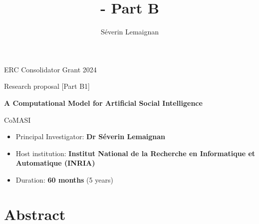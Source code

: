 \documentclass[11pt,a4paper]{report}
\title{\project - Part B}
\author{Séverin Lemaignan}
\newcommand{\project}{CoMASI\xspace}
\newcommand{\projecttitle}{A Computational Model for Artificial Social Intelligence\xspace}
\newcommand{\eu}[1]{}
\begin{document}
\maketitle

\begin{center}
    ERC Consolidator Grant 2024

    Research proposal [Part B1]

    \vspace{2cm}

    \textbf{\LARGE \projecttitle}

    \vspace{2cm}
    {\Huge \project}

\end{center}

    \vspace{2cm}

\begin{itemize}
    \item Principal Investigator: \textbf{Dr Séverin Lemaignan}
    \item Host institution: \textbf{Institut National de la Recherche en
        Informatique et Automatique (INRIA)}
    \item Duration: \textbf{60 months} (5 years)
\end{itemize}

\section*{Abstract}\label{abstract}

\eu{The abstract (summary) should, at a glance, provide the reader with a clear
understanding of the objectives of the research proposal and how they will be
achieved. The abstract will be used as the short description of your research
proposal in the evaluation process and in communications to contact in
particular the potential remote referees and/or inform the Commission and/or the
programme management committees and/or relevant national funding agencies
(provided you give permission to do so where requested in the online proposal
submission forms, section 1). It must therefore be short and precise and should
not contain confidential information. \\
Please use plain typed text, avoiding formulae and other special characters. The
abstract must be written in English. There is a limit of 2000 characters (spaces
and line breaks included).}
\end{document}
